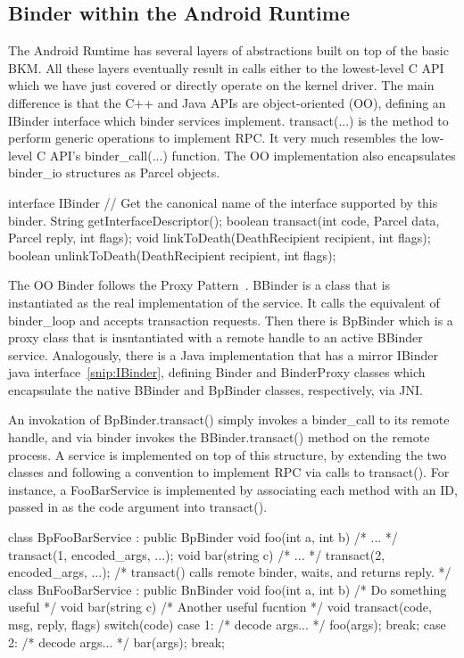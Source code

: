 \documentclass[prodmode]{acmlarge}
\begin{document}
\subsection{Binder within the Android Runtime}
The Android Runtime has several layers of abstractions built on top of the basic BKM. All these layers eventually result in calls either to the lowest-level C API which we have just covered or directly operate on the kernel driver. The main difference is that the C++ and Java APIs are object-oriented (OO), defining an IBinder interface which binder services implement. transact(...) is the method to perform generic operations to implement RPC. It very much resembles the low-level C API's binder\_call(...) function. The OO implementation also encapsulates binder\_io structures as Parcel objects.

\begin{snippet}[label=snip:IBinder]
interface IBinder {
  // Get the canonical name of the interface supported by this binder.
  String getInterfaceDescriptor();
  boolean transact(int code, Parcel data, Parcel reply, int flags);
  void linkToDeath(DeathRecipient recipient, int flags);
  boolean unlinkToDeath(DeathRecipient recipient, int flags);
}
\end{snippet}

The OO Binder follows the Proxy Pattern~\cite{ProxyPattern}. BBinder is a class that is instantiated as the real implementation of the service. It calls the equivalent of binder\_loop and accepts transaction requests. Then there is BpBinder which is a proxy class that is insntantiated with a remote handle to an active BBinder service. Analogously, there is a Java implementation that has a mirror IBinder java interface~\ref{snip:IBinder}, defining Binder and BinderProxy classes which encapsulate the native BBinder and BpBinder classes, respectively, via JNI.

An invokation of BpBinder.transact() simply invokes a binder\_call to its remote handle, and via binder invokes the BBinder.transact() method on the remote process. A service is implemented on top of this structure, by extending the two classes and following a convention to implement RPC via calls to transact(). For instance, a FooBarService is implemented by associating each method with an ID, passed in as the code argument into transact().

\begin{snippet}
class BpFooBarService : public BpBinder {
  void foo(int a, int b) { /* ... */ transact(1, encoded_args, ...); }
  void bar(string c) { /* ... */ transact(2, encoded_args, ...); }
  /* transact() calls remote binder, waits, and returns reply. */
}
class BnFooBarService : public BnBinder {
  void foo(int a, int b) { /* Do something useful */ }
  void bar(string c) { /* Another useful fucntion */ }
  void transact(code, msg, reply, flags) {
    switch(code) {
      case 1: /* decode args... */ foo(args); break;
      case 2: /* decode args... */ bar(args); break;
}}}
\end{snippet}
\end{document}
